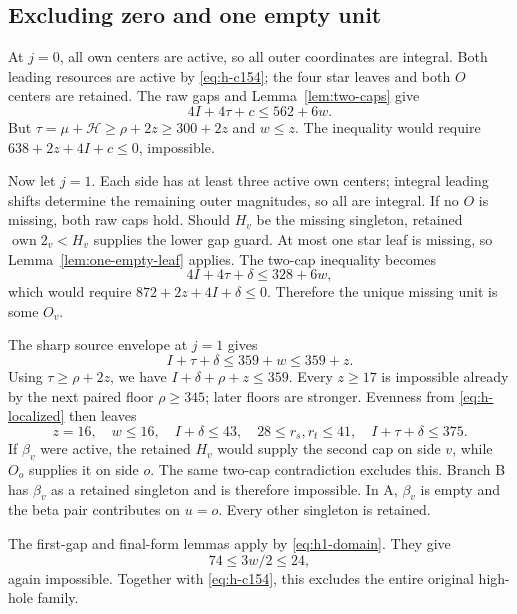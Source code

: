 \documentclass[11pt,letterpaper]{article}
\newcommand{\own}{\operatorname{own}}
\theoremstyle{definition}\newtheorem{definition}[theorem]{Definition}
\begin{document}
\subsection{Excluding zero and one empty unit}
At $j=0$, all own centers are active, so all outer coordinates are integral. Both leading resources are active by \eqref{eq:h-c154}; the four star leaves and both $O$ centers are retained. The raw gaps and Lemma~\ref{lem:two-caps} give
\[
4I+4\tau+c\le562+6w.
\]
But $\tau=\mu+\mathcal H\ge\rho+2z\ge300+2z$ and $w\le z$. The inequality would require $638+2z+4I+c\le0$, impossible.

Now let $j=1$. Each side has at least three active own centers; integral leading shifts determine the remaining outer magnitudes, so all are integral. If no $O$ is missing, both raw caps hold. Should $H_v$ be the missing singleton, retained $\own2_v<H_v$ supplies the lower gap guard. At most one star leaf is missing, so Lemma~\ref{lem:one-empty-leaf} applies. The two-cap inequality becomes
\[
4I+4\tau+\delta\le328+6w,
\]
which would require $872+2z+4I+\delta\le0$. Therefore the unique missing unit is some $O_v$.

The sharp source envelope at $j=1$ gives
\[
I+\tau+\delta\le359+w\le359+z.
\]
Using $\tau\ge\rho+2z$, we have $I+\delta+\rho+z\le359$. Every $z\ge17$ is impossible already by the next paired floor $\rho\ge345$; later floors are stronger. Evenness from \eqref{eq:h-localized} then leaves
\begin{equation}\label{eq:h1-domain}
z=16,\quad w\le16,\quad I+\delta\le43,\quad
28\le r_s,r_t\le41,\quad I+\tau+\delta\le375.
\end{equation}
If $\beta_v$ were active, the retained $H_v$ would supply the second cap on side $v$, while $O_o$ supplies it on side $o$. The same two-cap contradiction excludes this. Branch B has $\beta_v$ as a retained singleton and is therefore impossible. In A, $\beta_v$ is empty and the beta pair contributes on $u=o$. Every other singleton is retained.

The first-gap and final-form lemmas apply by \eqref{eq:h1-domain}. They give
\[
74\le3w/2\le24,
\]
again impossible. Together with \eqref{eq:h-c154}, this excludes the entire original high-hole family.
\end{document}
